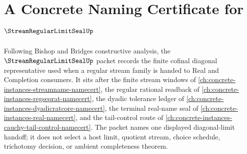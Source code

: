 \chapter{A Concrete Naming Certificate for $\StreamRegularLimitSealUp$}
\label{ch:concrete-instances-stream-regular-limit-seal-namecert}

Following Bishop and Bridges constructive analysis, the $\StreamRegularLimitSealUp$ packet records the finite cofinal diagonal representative used when a regular stream family is handed to Real and Completion consumers. It sits after the finite stream windows of \autoref{ch:concrete-instances-streamname-namecert}, the regular rational readback of \autoref{ch:concrete-instances-regseqrat-namecert}, the dyadic tolerance ledger of \autoref{ch:concrete-instances-dyadicratcore-namecert}, the terminal real-name seal of \autoref{ch:concrete-instances-real-namecert}, and the tail-control route of \autoref{ch:concrete-instances-cauchy-tail-control-namecert}. The packet names one displayed diagonal-limit handoff; it does not select a host limit, quotient stream, choice schedule, trichotomy decision, or ambient completeness theorem.

